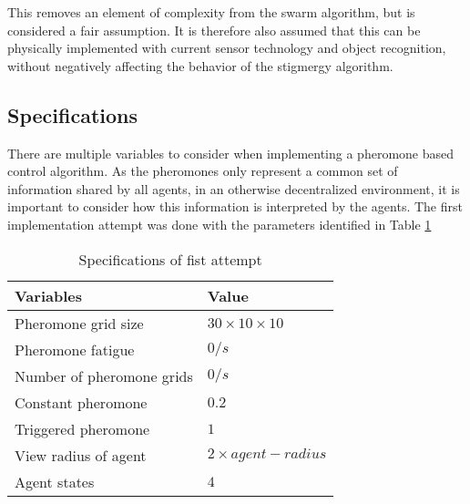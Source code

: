 This removes an element of complexity from the swarm algorithm, but is considered a fair assumption. It is therefore also assumed that this can be physically implemented with current sensor technology and object recognition, without negatively affecting the behavior of the stigmergy algorithm. 

\subsection{Specifications}
There are multiple variables to consider when implementing a pheromone based control algorithm. As the pheromones only represent a common set of information shared by all agents, in an otherwise decentralized environment, it is important to consider how this information is interpreted by the agents.  
The first implementation attempt was done with the parameters identified in Table \ref{tab:vars1}

\begin{table}[H]
\centering
\label{tab:vars1}
\begin{tabularx}{0.6\textwidth}{ll}
\toprule
\textbf{Variables}     & \textbf{Value}  \\ \hline
Pheromone grid size    & $30 \times 10 \times 10$               \\ \hline
Pheromone fatigue      & $0/s$               \\
Number of pheromone grids      & $0/s$               \\
Constant pheromone  & $0.2$             \\
Triggered pheromone & $1$               \\
View radius of agent   & $2 \times agent-radius$ \\
Agent states           & $4$               \\ \hline
\end{tabularx}
\caption{Specifications of fist attempt}
\end{table}


